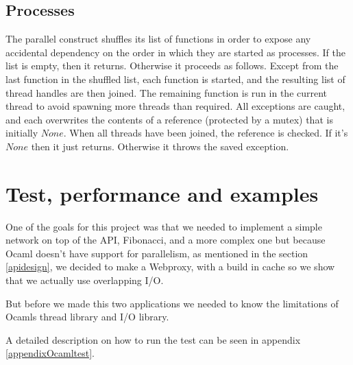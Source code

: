 \documentclass[a4paper,12pt]{article}
\begin{document}
\subsection{Processes}

The parallel construct shuffles its list of functions in order to expose any
accidental dependency on the order in which they are started as processes.
If the list is empty, then it returns. Otherwise it proceeds as follows.
Except from the last function in the shuffled list, each function is started,
and the resulting list of thread handles are then joined. The remaining
function is run in the current thread to avoid spawning more threads than
required. All exceptions are caught, and each overwrites the contents of a
reference (protected by a mutex) that is initially $None$. When all threads have
been joined, the reference is checked. If it's $None$ then it just returns.
Otherwise it throws the saved exception.

\section{Test, performance and examples}
\label{testexamples}
One of the goals for this project was that we needed to implement a simple
network on top of the API, Fibonacci, and a more complex one but because Ocaml
doesn't have support for parallelism, as mentioned in the section \ref{apidesign},
we decided to make a Webproxy, with a build in cache so we show that we actually
use overlapping I/O.

But before we made this two applications we needed to know the limitations of
Ocamls thread library and I/O library.

A detailed description on how to run the test can be seen in appendix
\ref{appendixOcamltest}.
\end{document}

